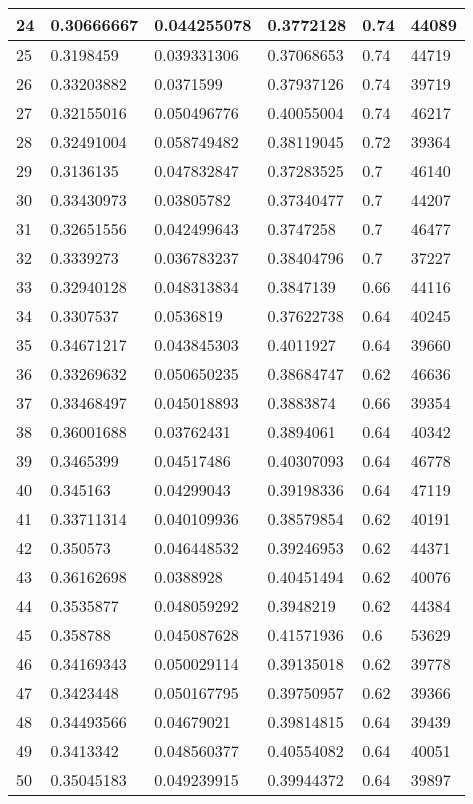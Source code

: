 \begin{longtable}{|l|l|l|l|l|l|}
24 & 0.30666667 & 0.044255078 & 0.3772128 & 0.74 & 44089 \\ \hline 
25 & 0.3198459 & 0.039331306 & 0.37068653 & 0.74 & 44719 \\ \hline 
26 & 0.33203882 & 0.0371599 & 0.37937126 & 0.74 & 39719 \\ \hline 
27 & 0.32155016 & 0.050496776 & 0.40055004 & 0.74 & 46217 \\ \hline 
28 & 0.32491004 & 0.058749482 & 0.38119045 & 0.72 & 39364 \\ \hline 
29 & 0.3136135 & 0.047832847 & 0.37283525 & 0.7 & 46140 \\ \hline 
30 & 0.33430973 & 0.03805782 & 0.37340477 & 0.7 & 44207 \\ \hline 
31 & 0.32651556 & 0.042499643 & 0.3747258 & 0.7 & 46477 \\ \hline 
32 & 0.3339273 & 0.036783237 & 0.38404796 & 0.7 & 37227 \\ \hline 
33 & 0.32940128 & 0.048313834 & 0.3847139 & 0.66 & 44116 \\ \hline 
34 & 0.3307537 & 0.0536819 & 0.37622738 & 0.64 & 40245 \\ \hline 
35 & 0.34671217 & 0.043845303 & 0.4011927 & 0.64 & 39660 \\ \hline 
36 & 0.33269632 & 0.050650235 & 0.38684747 & 0.62 & 46636 \\ \hline 
37 & 0.33468497 & 0.045018893 & 0.3883874 & 0.66 & 39354 \\ \hline 
38 & 0.36001688 & 0.03762431 & 0.3894061 & 0.64 & 40342 \\ \hline 
39 & 0.3465399 & 0.04517486 & 0.40307093 & 0.64 & 46778 \\ \hline 
40 & 0.345163 & 0.04299043 & 0.39198336 & 0.64 & 47119 \\ \hline 
41 & 0.33711314 & 0.040109936 & 0.38579854 & 0.62 & 40191 \\ \hline 
42 & 0.350573 & 0.046448532 & 0.39246953 & 0.62 & 44371 \\ \hline 
43 & 0.36162698 & 0.0388928 & 0.40451494 & 0.62 & 40076 \\ \hline 
44 & 0.3535877 & 0.048059292 & 0.3948219 & 0.62 & 44384 \\ \hline 
45 & 0.358788 & 0.045087628 & 0.41571936 & 0.6 & 53629 \\ \hline 
46 & 0.34169343 & 0.050029114 & 0.39135018 & 0.62 & 39778 \\ \hline 
47 & 0.3423448 & 0.050167795 & 0.39750957 & 0.62 & 39366 \\ \hline 
48 & 0.34493566 & 0.04679021 & 0.39814815 & 0.64 & 39439 \\ \hline 
49 & 0.3413342 & 0.048560377 & 0.40554082 & 0.64 & 40051 \\ \hline 
50 & 0.35045183 & 0.049239915 & 0.39944372 & 0.64 & 39897 \\ \hline 
\end{longtable}